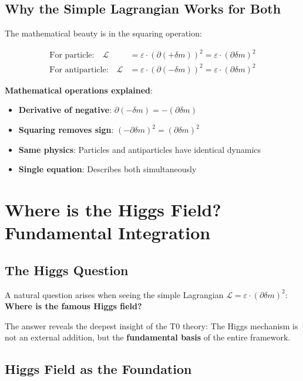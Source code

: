 \documentclass[12pt,a4paper]{article}
\newcommand{\Lag}{\mathcal{L}}
\newcommand{\deltam}{\delta m}
\theoremstyle{definition}
\theoremstyle{remark}
\begin{document}
	\subsection{Why the Simple Lagrangian Works for Both}
	
	The mathematical beauty is in the squaring operation:
	
	\begin{align}
		\text{For particle:} \quad \Lag &= \varepsilon \cdot (\partial (+\deltam))^2 = \varepsilon \cdot (\partial \deltam)^2 \\
		\text{For antiparticle:} \quad \Lag &= \varepsilon \cdot (\partial (-\deltam))^2 = \varepsilon \cdot (\partial \deltam)^2
	\end{align}
	
	\textbf{Mathematical operations explained}:
	\begin{itemize}
		\item \textbf{Derivative of negative}: $\partial(-\deltam) = -(\partial\deltam)$
		\item \textbf{Squaring removes sign}: $(-\partial\deltam)^2 = (\partial\deltam)^2$
		\item \textbf{Same physics}: Particles and antiparticles have identical dynamics
		\item \textbf{Single equation}: Describes both simultaneously
	\end{itemize}
	
	\section{Where is the Higgs Field? Fundamental Integration}
	
	\subsection{The Higgs Question}
	
	A natural question arises when seeing the simple Lagrangian $\Lag = \varepsilon \cdot (\partial \deltam)^2$: \textbf{Where is the famous Higgs field?}
	
	The answer reveals the deepest insight of the T0 theory: The Higgs mechanism is not an external addition, but the \textbf{fundamental basis} of the entire framework.
	
	\subsection{Higgs Field as the Foundation}
	
\end{document}
